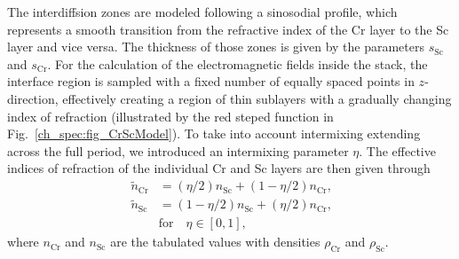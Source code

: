 The interdiffsion zones are modeled following a sinosodial profile, which represents a smooth transition from the refractive index of the Cr layer to the Sc layer and vice versa. The thickness of those zones is given by the parameters $s_\text{Sc}$ and $s_\text{Cr}$. For the calculation of the electromagnetic fields inside the stack, the interface region is sampled with a fixed number of equally spaced points in $z$-direction, effectively creating a region of thin sublayers with a gradually changing index of refraction (illustrated by the red steped function in Fig.~\ref{ch_spec:fig_CrScModel}). To take into account intermixing extending across the full period, we introduced an intermixing parameter $\eta$. The effective indices of refraction of the individual Cr and Sc layers are then given through
\begin{align}
\tilde{n}_\text{Cr} &=(\eta/2) n_\text{Sc} + (1-\eta/2) n_\text{Cr} \text{,} 
\nonumber\\
\tilde{n}_\text{Sc} &=(1-\eta/2) n_\text{Sc} + (\eta/2) n_\text{Cr} \text{,} 
\label{eqn:effective_n} \\
&\text{for} \quad \eta \in [0,1] \text{,}\nonumber
\end{align}
where $n_\text{Cr}$ and $n_\text{Sc}$ are the tabulated values \cite{henke_x-ray_1993} 
with densities $\rho_\text{Cr}$ and $\rho_\text{Sc}$.

